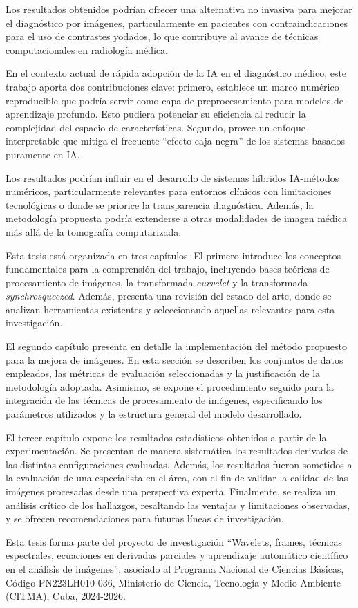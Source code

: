 Los resultados obtenidos podrían ofrecer una alternativa no invasiva para mejorar el diagnóstico por imágenes, particularmente en pacientes con contraindicaciones para el uso de contrastes yodados, lo que contribuye al avance de técnicas computacionales en radiología médica.

En el contexto actual de rápida adopción de la IA en el diagnóstico médico, este trabajo aporta dos contribuciones clave: primero, establece un marco numérico reproducible que podría servir como capa de preprocesamiento para modelos de aprendizaje profundo. Esto pudiera potenciar su eficiencia al reducir la complejidad del espacio de características. Segundo, provee un enfoque interpretable que mitiga el frecuente ``efecto caja negra'' de los sistemas basados puramente en IA.

Los resultados podrían influir en el desarrollo de sistemas híbridos IA-métodos numéricos, particularmente relevantes para entornos clínicos con limitaciones tecnológicas o donde se priorice la transparencia diagnóstica. Además, la metodología propuesta podría extenderse a otras modalidades de imagen médica más allá de la tomografía computarizada.

Esta tesis está organizada en tres capítulos. El primero introduce los conceptos fundamentales para la comprensión del trabajo, incluyendo bases teóricas de procesamiento de imágenes, la transformada \emph{curvelet} y la transformada \emph{synchrosqueezed}. Además, presenta una revisión del estado del arte, donde se analizan herramientas existentes y seleccionando aquellas relevantes para esta investigación.

El segundo capítulo presenta en detalle la implementación del método propuesto para la mejora de imágenes. En esta sección se describen los conjuntos de datos empleados, las métricas de evaluación seleccionadas y la justificación de la metodología adoptada. Asimismo, se expone el procedimiento seguido para la integración de las técnicas de procesamiento de imágenes, especificando los parámetros utilizados y la estructura general del modelo desarrollado.

El tercer capítulo expone los resultados estadísticos obtenidos a partir de la experimentación. Se presentan de manera sistemática los resultados derivados de las distintas configuraciones evaluadas. Además, los resultados fueron sometidos a la evaluación de una especialista en el área, con el fin de validar la calidad de las imágenes procesadas desde una perspectiva experta. Finalmente, se realiza un análisis crítico de los hallazgos, resaltando las ventajas y limitaciones observadas, y se ofrecen recomendaciones para futuras líneas de investigación.

Esta tesis forma parte del proyecto de investigación ``Wavelets, frames, técnicas espectrales, ecuaciones en derivadas parciales y aprendizaje automático científico en el análisis de imágenes'', asociado al Programa Nacional de Ciencias Básicas, Código PN223LH010-036, Ministerio de Ciencia, Tecnología y Medio Ambiente (CITMA), Cuba, 2024-2026.

